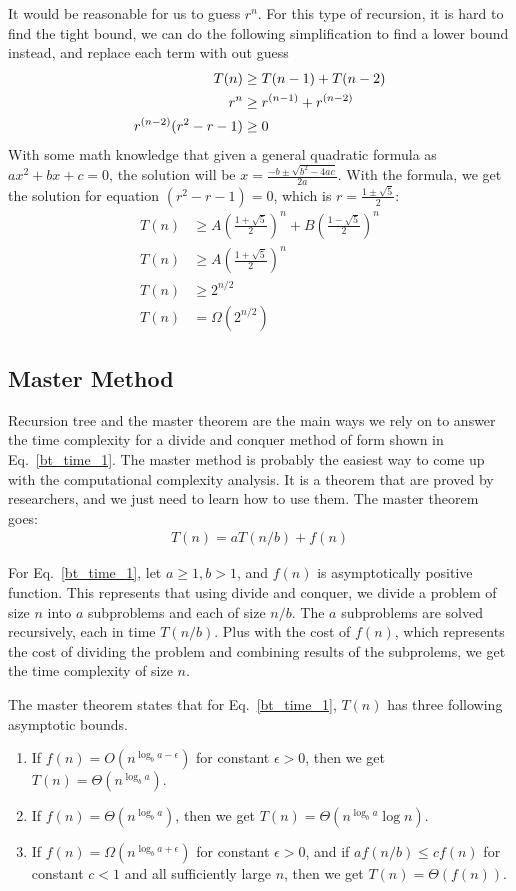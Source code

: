 \documentclass[a4paper,11pt]{book}
\begin{document}
It would be reasonable for us to guess $r^n$. For this type of recursion, it is hard to find the tight bound, we can do the following simplification to find a lower bound instead, and replace each term with out guess
\begin{align}
\label{complexity_eq_fibonacci_2}
    T(n)&\geq T(n-1)+T(n-2)\\
    r^n &\geq r^{(n-1)}+r^{(n-2)}\notag\\
    r^{(n-2)}(r^2-r-1)&\geq 0
\end{align}
With some math knowledge that given a general quadratic formula as $ax^2+bx+c=0$, the solution will be $x=\frac{-b\pm\sqrt{b^2-4ac}}{2a}$. With the formula, we get the solution for equation $(r^2-r-1)=0$, which is $r=\frac{1\pm\sqrt{5}}{2}$:
\begin{align}
\label{complexity_eq_fibonacci_3}
    T(n)&\geq A(\frac{1+\sqrt{5}}{2})^n+B(\frac{1-\sqrt{5}}{2})^n\\
    T(n)&\geq A(\frac{1+\sqrt{5}}{2})^n\\
    T(n)&\geq2^{n/2}\\
    T(n) &= \Omega(2^{n/2})
\end{align}
\subsection{Master Method} Recursion tree and the master theorem are the main ways we rely on to answer the time complexity for a divide and conquer method of form shown in Eq.~\ref{bt_time_1}. The master method is probably the easiest way to come up with the computational complexity analysis. It is a theorem that are proved by researchers, and we just need to learn how to use them. The master theorem goes:
\begin{align}
\label{bt_time_1}
    T(n)=aT(n/b)+f(n)
\end{align}

For Eq.~\ref{bt_time_1}, let $a\geq1, b>1$, and $f(n)$ is asymptotically positive function. This represents that using divide and conquer, we divide a problem of size $n$ into $a$ subproblems and each of size $n/b$. The $a$ subproblems are solved recursively, each in time $T(n/b)$. Plus with the cost of $f(n)$, which represents the cost of dividing the problem and combining results of the subprolems, we get the time complexity of size $n$. 

The master theorem states that for Eq.~\ref{bt_time_1}, $T(n)$ has three following asymptotic bounds.  
\begin{enumerate}
    \item If $f(n) = O(n^{\log_b a - \epsilon})$ for constant $\epsilon>0$, then we get $T(n) = \Theta(n^{\log_b a})$.
    \item If $f(n) = \Theta(n^{\log_b a })$, then we get $T(n) = \Theta(n^{\log_b a} \log n)$.
    \item If $f(n) = \Omega(n^{\log_b a + \epsilon})$ for constant $\epsilon>0$, and if $a f(n/b)\leq cf(n)$ for constant $c<1$ and all sufficiently large $n$, then we get $T(n) = \Theta(f(n))$.
\end{enumerate}
\end{document}
